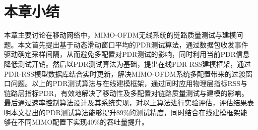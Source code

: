\section{本章小结}
\label{sec:conclusion3}

本章主要讨论在移动网络中，MIMO-OFDM无线系统的链路质量测试与建模问题。本文首先提出基于动态滑动窗口平均的PDR测试算法，通过数据包收发事件驱动确定采样间隔，从而避免多配置对PDR测试的影响，同时利用当前PDR信息降低测试开销。然后以PDR测试算法为基础，提出在线PDR-RSS建模框架，通过PDR-RSS模型数据库结合实时更新，解决MIMO-OFDM系统多配置带来的过渡窗口问题。以上的PDR测试算法与在线建模框架，通过同时应用物理层指标RSS与链路层指标PDR，有效地解决了移动性及多配置对链路质量测试与建模的影响。最后通过速率控制算法设计及其系统实现，对以上算法进行实验评估，评估结果表明本文提出的PDR测试算法能够提升89\%的测试精度，同时结合在线建模框架能够在不同MIMO配置下实现40\%的吞吐量提升。


\nocite{10.1109/TMC.2009.87,Ahmed2008Online,Deek:2011,dujovne2010taxonomy,hiertz2010802.11,kim2006accurate,kim2009experimental,kolar2011mesh}
\nocite{Pelechrinis2010high,perahia2008next,sevani2012sir,zhang2008practical,Zhao2003delivery}

\nocite{Balan:2012:AHD:2348543.2348552,Bhartia:2011:HFD:2030613.2030642,Chai:2012:BES:2348543.2348564,Gollakota:2011:CRS:2018436.2018456}
\nocite{Gudipati:2011:SAR:2018436.2018455,Magistretti:2011:WRW:2030613.2030619,Magistretti:2010:IML:1859995.1860030,Manweiler:2011:ARH:1999995.2000020}
\nocite{Nguyen:2011:OCD:2030613.2030624,Qian:2011:PRU:1999995.2000026,Rozner:2010:NNP:1814433.1814445,Sanadhya:2012:ACI:2348543.2348565}
